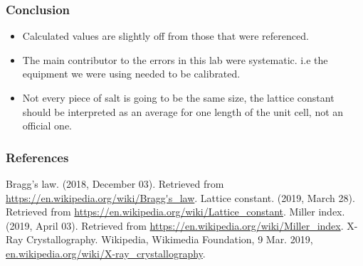 \documentclass{beamer}
\begin{document}

\begin{frame}
\frametitle{Conclusion}
\begin{itemize}
\item{Calculated values are slightly off from those that were referenced.}
\item{The main contributor to the errors in this lab were systematic. i.e the equipment we were using needed to be calibrated.}
\item{Not every piece of salt is going to be the same size, the lattice constant should be interpreted as an average for one length of the unit cell, not an official one.}
\end{itemize}
\end{frame}


\begin{frame}
\frametitle{References}
\begin{thebibliography}{99} 
Bragg's law. (2018, December 03). Retrieved from \url{https://en.wikipedia.org/wiki/Bragg's_law}.
Lattice constant. (2019, March 28). Retrieved from \url{https://en.wikipedia.org/wiki/Lattice_constant}.
Miller index. (2019, April 03). Retrieved from \url{https://en.wikipedia.org/wiki/Miller_index}.
X-Ray Crystallography. Wikipedia, Wikimedia Foundation, 9 Mar. 2019, \url{en.wikipedia.org/wiki/X-ray_crystallography}.
\end{thebibliography}
\end{frame}
\end{document}
